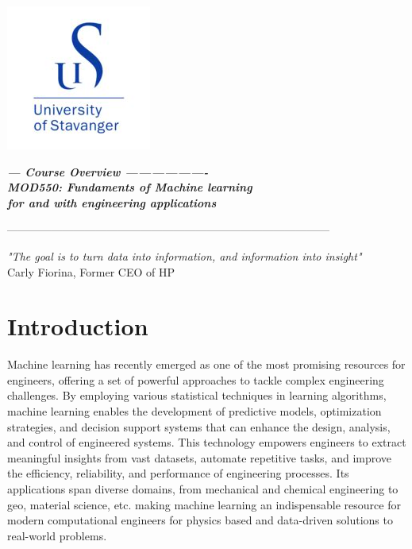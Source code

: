 \documentclass[letterpaper,12pt,oneside]{article}
\begin{document}
\begin{flushright}
\includegraphics[scale=0.5]{uis_logo.jpeg}
\end{flushright}


\vspace{-8.3em}
\begin{flushleft}
\Large\textit{\bf  --- Course Overview ------------------- \\
MOD550: Fundaments of Machine learning \\ for and with
engineering applications   \\   }
\end{flushleft}

---------------------------------------------------------------------------------------

\vspace{1.5em}

\begin{flushleft}
\textit{"The goal is to turn data into information, and information into insight"} \\
Carly Fiorina, Former CEO of HP

\end{flushleft}

\section*{Introduction}
Machine learning has recently emerged as one of the most promising resources for engineers, offering a set of powerful approaches to tackle complex engineering challenges. By employing various statistical techniques in learning algorithms, machine learning enables the development of predictive models, optimization strategies, and decision support systems that can enhance the design, analysis, and control of engineered systems. This technology empowers engineers to extract meaningful insights from vast datasets, automate repetitive tasks, and improve the efficiency, reliability, and performance of engineering processes. Its applications span diverse domains, from mechanical and chemical engineering to geo, material science, etc. making machine learning an indispensable resource for modern computational engineers for physics based and data-driven solutions to real-world problems.
\end{document}
